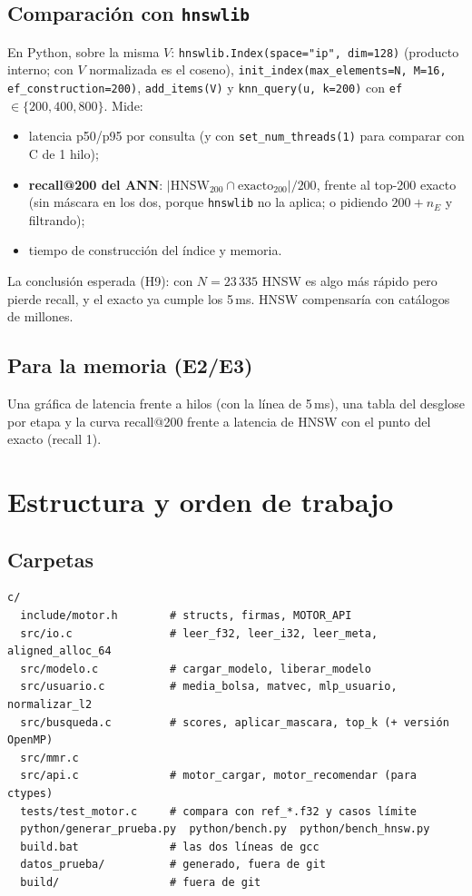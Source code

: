 \documentclass[a4paper,11pt]{article}
\newcommand{\cod}[1]{\texttt{#1}}
\begin{document}
\subsection{Comparación con \texttt{hnswlib}}\label{sec:hnsw}
En Python, sobre la misma $V$: \cod{hnswlib.Index(space="ip", dim=128)} (producto interno; con $V$ normalizada es el
coseno), \cod{init\_index(max\_elements=N, M=16, ef\_construction=200)}, \cod{add\_items(V)} y
\cod{knn\_query(u, k=200)} con \cod{ef} $\in \{200, 400, 800\}$. Mide:
\begin{itemize}
  \item latencia p50/p95 por consulta (y con \cod{set\_num\_threads(1)} para comparar con C de 1 hilo);
  \item \textbf{recall@200 del ANN}: $|\text{HNSW}_{200} \cap \text{exacto}_{200}|/200$, frente al top-200 exacto (sin
        máscara en los dos, porque \cod{hnswlib} no la aplica; o pidiendo $200 + n_E$ y filtrando);
  \item tiempo de construcción del índice y memoria.
\end{itemize}
La conclusión esperada (H9): con $N = 23\,335$ HNSW es algo más rápido pero pierde recall, y el exacto ya cumple los
5\,ms. HNSW compensaría con catálogos de millones.

\subsection{Para la memoria (E2/E3)}
Una gráfica de latencia frente a hilos (con la línea de 5\,ms), una tabla del desglose por etapa y la curva
recall@200 frente a latencia de HNSW con el punto del exacto (recall 1).

\section{Estructura y orden de trabajo}

\subsection{Carpetas}
\begin{lstlisting}
c/
  include/motor.h        # structs, firmas, MOTOR_API
  src/io.c               # leer_f32, leer_i32, leer_meta, aligned_alloc_64
  src/modelo.c           # cargar_modelo, liberar_modelo
  src/usuario.c          # media_bolsa, matvec, mlp_usuario, normalizar_l2
  src/busqueda.c         # scores, aplicar_mascara, top_k (+ versión OpenMP)
  src/mmr.c
  src/api.c              # motor_cargar, motor_recomendar (para ctypes)
  tests/test_motor.c     # compara con ref_*.f32 y casos límite
  python/generar_prueba.py  python/bench.py  python/bench_hnsw.py
  build.bat              # las dos líneas de gcc
  datos_prueba/          # generado, fuera de git
  build/                 # fuera de git
\end{lstlisting}
\end{document}
